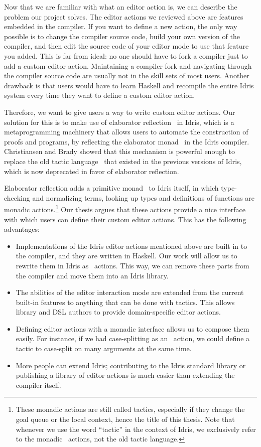 Now that we are familiar with what an editor action is, we can describe the problem
our project solves. The editor actions we reviewed above are features embedded
in the compiler. If you want to define a new action, the only way possible is
to change the compiler source code, build your own version of the compiler,
and then edit the source code of your editor mode to use that feature you
added. This is far from ideal: no one should have to fork a compiler
just to add a custom editor action. Maintaining a compiler fork and
navigating through the compiler source code are usually not in the skill sets
of most users.
Another drawback is that users would have to learn Haskell and recompile the
entire Idris system every time they want to define a custom editor action.

Therefore, we want to give users a way to write custom editor actions. Our
solution for this is to make use of elaborator reflection~\cite{elabref,leanmeta} in
Idris, which is a metaprogramming machinery that allows users to automate the
construction of proofs and programs, by reflecting the elaborator
monad~\cite{idris} in the Idris compiler. Christiansen and Brady showed that
this mechanism is powerful enough to replace the old tactic
language~\cite{elabref} that existed in the previous versions of Idris, which is
now deprecated in favor of elaborator reflection.

Elaborator reflection adds a primitive monad \Elab\ to Idris itself, in which
type-checking and normalizing terms, looking up types and definitions of
functions are monadic actions.\footnote{These monadic actions are still called
tactics, especially if they change the goal queue or the local context, hence the
title of this thesis. Note that whenever we use the word ``tactic'' in the
context of Idris, we exclusively refer to the monadic \Elab\ actions, not the
old tactic language.}
Our thesis argues that these actions provide a nice interface with which users
can define their custom editor actions. This has the following advantages:

\begin{itemize}
\item Implementations of the Idris editor actions mentioned above are
built in to the compiler, and they are written in Haskell. Our work will allow
us to rewrite them in Idris as \Elab\ actions. This way, we can remove these
parts from the compiler and move them into an Idris library.
\item The abilities of the editor interaction mode are extended from the
current built-in features to anything that can be done with tactics. This
allows library and DSL authors to provide domain-specific editor actions.
\item Defining editor actions with a monadic interface allows us to
compose them easily. For instance, if we had case-splitting as an
\Elab\ action, we could define a tactic to case-split on many arguments at the
same time.
\item More people can extend Idris; contributing to the Idris standard library
  or publishing a library of editor actions is much easier than extending the
    compiler itself.
\end{itemize}

